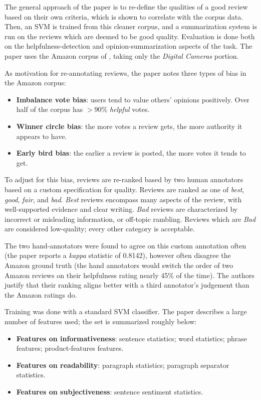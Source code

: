 \documentclass[12pt,letterpaper]{article}
\begin{document}
The general approach of the paper is to re-define the qualities of a good review based on their
	own criteria, which is shown to correlate with the corpus data.
Then, an SVM is trained from this cleaner corpus, and a summarization system is run on the reviews
	which are deemed to be good quality.
Evaluation is done both on the helpfulness-detection and opinion-summarization aspects of the task.
The paper uses the Amazon corpus of , taking only the {\em Digital Cameras}
	portion. 

As motivation for re-annotating reviews, the paper notes three types of bias in the Amazon corpus:
\begin{itemize}
	\item {\bf Imbalance vote bias}: users tend to value others' opinions positively.
		Over half of the corpus has $>90\%$ {\em helpful} votes.
	\item {\bf Winner circle bias}: the more votes a review gets, the more authority it appears to have.
	\item {\bf Early bird bias}: the earlier a review is posted, the more votes it tends to get.
\end{itemize}

To adjust for this bias, reviews are re-ranked based by two human annotators based on a custom
	specification for quality.
Reviews are ranked as one of {\em best}, {\em good}, {\em fair}, and {\em bad}.
{\em Best} reviews encompass many aspects of the review, with well-supported evidence and clear writing.
{\em Bad} reviews are characterized by incorrect or misleading information, or off-topic rambling.
Reviews which are {\em Bad} are considered low-quality; every other category is acceptable.

The two hand-annotators were found to agree on this custom annotation often (the paper
	reports a {\em kappa} statistic of 0.8142), however often disagree the
	Amazon ground truth (the hand annotators would switch the order of two
	Amazon reviews on their helpfulness rating nearly 45\% of the time).
The authors justify that their ranking aligns better with a third annotator's judgement than
	the Amazon ratings do.

Training was done with a standard SVM classifier.
The paper describes a large number of features used; the set is summarized roughly below:
\begin{itemize}
	\item {\bf Features on informativeness}: sentence statistics; word statistics; phrase features; product-features features.
	\item {\bf Features on readability}: paragraph statistics; paragraph separator statistics.
	\item {\bf Features on subjectiveness}: sentence sentiment statistics.
\end{itemize}
\end{document}
